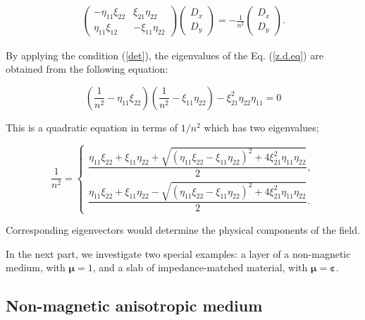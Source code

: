 \documentclass[9pt,twocolumn,twoside]{osajnl}
\begin{document}
\begin{eqnarray}\label{z.d.eq}
        \begin{pmatrix}
            - \eta_{11} \xi_{22}  & \xi_{21}\eta_{22} \\
             \eta_{11} \xi_{12}& -\xi_{11}\eta_{22}
        \end{pmatrix}
        \begin{pmatrix}
            D_{x} \\ D_{y}
        \end{pmatrix}
        = -\frac{1}{n^{2}}
        \begin{pmatrix}
            D_{x} \\ D_{y}
        \end{pmatrix}.
\end{eqnarray}

By applying the condition (\ref{det}), the eigenvalues of the Eq. (\ref{z.d.eq}) are obtained from the following equation:

\begin{equation}\label{gn}
 \left( \dfrac{1}{n^2}- \eta_{11} \xi_{22}\right)\left(\dfrac{1}{n^2}-\xi_{11}\eta_{22}\right)-\xi_{21}^{2}\eta_{22}\eta_{11}=0
\end{equation}

This is a quadratic equation in terms of $1/n^2$ which has two eigenvalues;

\begin{equation}\label{general-n}
\dfrac{1}{n^2}=
\begin{cases}
\dfrac{\eta_{11} \xi_{22}+\xi_{11}\eta_{22}+ \sqrt{\left(\eta_{11} \xi_{22}-\xi_{11}\eta_{22}\right)^{2}+4\xi_{21}^{2}\eta_{11}\eta_{22}}}{2},\\
\dfrac{\eta_{11} \xi_{22}+\xi_{11}\eta_{22}- \sqrt{\left(\eta_{11} \xi_{22}-\xi_{11}\eta_{22}\right)^{2}+4\xi_{21}^{2}\eta_{11}\eta_{22}}}{2}.
\end{cases}
\end{equation}

Corresponding eigenvectors would determine the physical components of the field. 

In the next part, we investigate two special examples: a layer of a non-magnetic medium, with $\boldsymbol \mu=1$, and a slab of impedance-matched material, with $\boldsymbol \mu = \boldsymbol \varepsilon $. 

\subsection{Non-magnetic anisotropic medium}\label{electric anisotropic}
\end{document}
